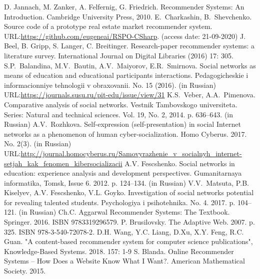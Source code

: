 \documentclass[conference,a4]{IEEEtran}
\begin{document}
\begin{thebibliography}{99}
 D. Jannach, M. Zanker, A. Felfernig, G. Friedrich. Recommender Systems: An Introduction. Cambridge University Press, 2010.
E.~Charkashin, B.~Shevchenko. Source code of a prototype real estate market recommender system.  URL:\url{https://github.com/eugeneai/RSPO-CSharp}. (access date: 21-09-2020)
 J. Beel, B. Gripp, S. Langer, C. Breitinger. Research-paper recommender systems: a literature survey. International Journal on Digital Libraries (2016) 17: 305. 
S.P.~Balandina, M.V.~Bautin, A.V.~Maiyorov, E.R.~Smirnova. Social networks as means of education and educational participants interactions. Pedagogicheskie i informacionniye tehnologii v obraxovanii. No. 15 (2016). (in Russian) URL:\url{https://journals.susu.ru/pit-edu/issue/view/31}
K.S.~Veber, A.A.~Pimenova. Comparative analysis of social networks. Vestnik Tambovskogo universiteta. Series: Natural and technical sciences. Vol. 19, No. 2, 2014. p. 636--643. (in Russian)
A.V.~Rozhkova. Self-expression (self-presentation) in social Internet networks as a phenomenon of human cyber-socialization. Homo Cyberus. 2017. No. 2(3). (in Russian) URL:\url{http://journal.homocyberus.ru/Samovyrazhenie_v_socialnyh_internet-setjah_kak_fenomen_kibersocializacii}
 A.V. Fescshenko. Social networks in education: experience analysis and development perspectives. Gumanitarnaya informatika, Tomsk, Issue 6. 2012. p. 124--134. (in Russian)
V.V.~Matsuta, P.B. Kiselyev, A.V. Fescshenko, V.L. Goyko. Investigation of social networks potential for revealing talented students. Psychologiya i psihotehnika. No. 4. 2017. p. 104--121. (in Russian)
Ch.C. Aggarwal Recommender Systems: The Textbook. Springer. 2016. ISBN 9783319296579.
P. Brusilovsky. The Adaptive Web. 2007. p. 325. ISBN 978-3-540-72078-2.
D.H. Wang, Y.C. Liang, D.Xu, X.Y. Feng, R.C. Guan. "A content-based recommender system for computer science publications", Knowledge-Based Systems. 2018. 157: 1-9
S. Blanda. Online Recommender Systems – How Does a Website Know What I Want?. American Mathematical Society. 2015.

\end{thebibliography}
\end{document}
